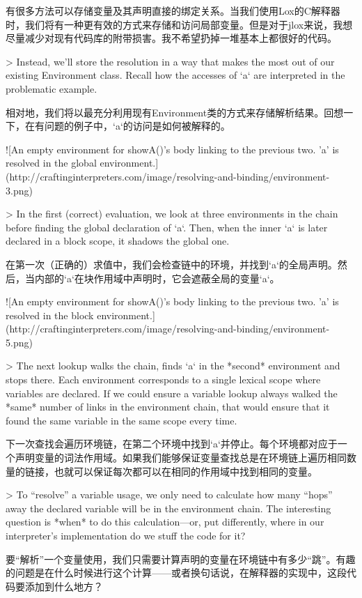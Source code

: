\documentclass[cn,11pt,chinese]{elegantbook}
\begin{document}
{{{{{{{{{{{{有很多方法可以存储变量及其声明直接的绑定关系。当我们使用Lox的C解释器时，我们将有一种更有效的方式来存储和访问局部变量。但是对于jlox来说，我想尽量减少对现有代码库的附带损害。我不希望扔掉一堆基本上都很好的代码。

> Instead, we’ll store the resolution in a way that makes the most out of our existing Environment class. Recall how the accesses of `a` are interpreted in the problematic example.

相对地，我们将以最充分利用现有Environment类的方式来存储解析结果。回想一下，在有问题的例子中，`a`的访问是如何被解释的。

![An empty environment for showA()'s body linking to the previous two. 'a' is resolved in the global environment.](http://craftinginterpreters.com/image/resolving-and-binding/environment-3.png)

> In the first (correct) evaluation, we look at three environments in the chain before finding the global declaration of `a`. Then, when the inner `a` is later declared in a block scope, it shadows the global one.

在第一次（正确的）求值中，我们会检查链中的环境，并找到`a`的全局声明。然后，当内部的`a`在块作用域中声明时，它会遮蔽全局的变量`a`。

![An empty environment for showA()'s body linking to the previous two. 'a' is resolved in the block environment.](http://craftinginterpreters.com/image/resolving-and-binding/environment-5.png)

> The next lookup walks the chain, finds `a` in the *second* environment and stops there. Each environment corresponds to a single lexical scope where variables are declared. If we could ensure a variable lookup always walked the *same* number of links in the environment chain, that would ensure that it found the same variable in the same scope every time.

下一次查找会遍历环境链，在第二个环境中找到`a`并停止。每个环境都对应于一个声明变量的词法作用域。如果我们能够保证变量查找总是在环境链上遍历相同数量的链接，也就可以保证每次都可以在相同的作用域中找到相同的变量。

> To “resolve” a variable usage, we only need to calculate how many “hops” away the declared variable will be in the environment chain. The interesting question is *when* to do this calculation—or, put differently, where in our interpreter’s implementation do we stuff the code for it?

要“解析”一个变量使用，我们只需要计算声明的变量在环境链中有多少“跳”。有趣的问题是在什么时候进行这个计算——或者换句话说，在解释器的实现中，这段代码要添加到什么地方？

}}}}}}}}}}}}
\end{document}
